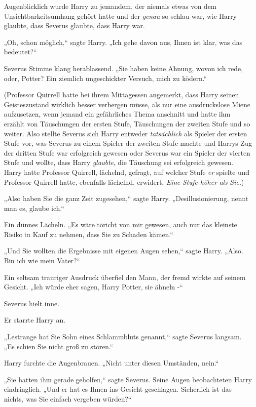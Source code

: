 {Augenblicklich wurde Harry zu jemandem, der niemals etwas von dem Unsichtbarkeitsumhang gehört hatte und der \emph{genau} so schlau war, wie Harry glaubte, dass Severus glaubte, dass Harry war.

„Oh, schon möglich,“ sagte Harry. „Ich gehe davon aus, Ihnen ist klar, was das bedeutet?“

Severus Stimme klang herablassend. „Sie haben keine Ahnung, wovon ich rede, oder, Potter? Ein ziemlich ungeschickter Versuch, mich zu ködern.“

(Professor Quirrell hatte bei ihrem Mittagessen angemerkt, dass Harry seinen Geisteszustand wirklich besser verbergen müsse, als nur eine ausdruckslose Miene aufzusetzen, wenn jemand ein gefährliches Thema anschnitt und hatte ihm erzählt von Täuschungen der ersten Stufe, Täuschungen der zweiten Stufe und so weiter. Also stellte Severus sich Harry entweder \emph{tatsächlich} als Spieler der ersten Stufe vor, was Severus zu einem Spieler der zweiten Stufe machte und Harrys Zug der dritten Stufe war erfolgreich gewesen oder Severus war ein Spieler der vierten Stufe und wollte, dass Harry \emph{glaubte,} die Täuschung sei erfolgreich gewesen. Harry hatte Professor Quirrell, lächelnd, gefragt, auf welcher Stufe \emph{er} spielte und Professor Quirrell hatte, ebenfalls lächelnd, erwidert, \emph{Eine Stufe höher als Sie.})

„Also haben Sie die ganz Zeit zugesehen,“ sagte Harry. „Desillusionierung, nennt man es, glaube ich.“

Ein dünnes Lächeln. „Es wäre töricht von mir gewesen, auch nur das kleinste Risiko in Kauf zu nehmen, dass Sie zu Schaden kämen.“

„Und Sie wollten die Ergebnisse mit eigenen Augen sehen,“ sagte Harry. „Also. Bin ich wie mein Vater?“

Ein seltsam trauriger Ausdruck überfiel den Mann, der fremd wirkte auf seinem Gesicht. „Ich würde eher sagen, Harry Potter, sie ähneln -“

Severus hielt inne.

Er starrte Harry an.

„Lestrange hat Sie Sohn eines Schlammbluts genannt,“ sagte Severus langsam. „Es schien Sie nicht groß zu stören.“

Harry furchte die Augenbrauen. „Nicht unter diesen Umständen, nein.“

„Sie hatten ihm gerade geholfen,“ sagte Severus. Seine Augen beobachteten Harry eindringlich. „Und er hat es Ihnen ins Gesicht geschlagen. Sicherlich ist das nichts, was Sie einfach vergeben würden?“

}
